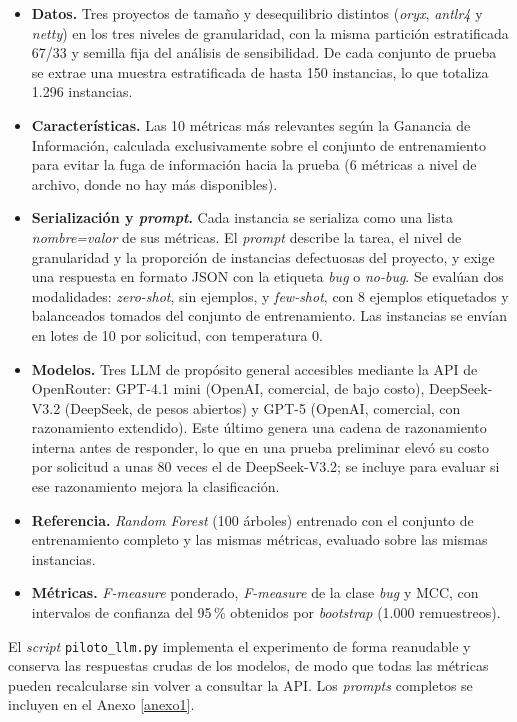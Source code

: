 \begin{itemize}
    \item \textbf{Datos.} Tres proyectos de tamaño y desequilibrio distintos (\textit{oryx}, \textit{antlr4} y \textit{netty}) en los tres niveles de granularidad, con la misma partición estratificada 67/33 y semilla fija del análisis de sensibilidad. De cada conjunto de prueba se extrae una muestra estratificada de hasta 150 instancias, lo que totaliza 1.296 instancias.
    \item \textbf{Características.} Las 10 métricas más relevantes según la Ganancia de Información, calculada exclusivamente sobre el conjunto de entrenamiento para evitar la fuga de información hacia la prueba (6 métricas a nivel de archivo, donde no hay más disponibles).
    \item \textbf{Serialización y \textit{prompt}.} Cada instancia se serializa como una lista \textit{nombre=valor} de sus métricas. El \textit{prompt} describe la tarea, el nivel de granularidad y la proporción de instancias defectuosas del proyecto, y exige una respuesta en formato JSON con la etiqueta \textit{bug} o \textit{no-bug}. Se evalúan dos modalidades: \textit{zero-shot}, sin ejemplos, y \textit{few-shot}, con 8 ejemplos etiquetados y balanceados tomados del conjunto de entrenamiento. Las instancias se envían en lotes de 10 por solicitud, con temperatura 0.
    \item \textbf{Modelos.} Tres LLM de propósito general accesibles mediante la API de OpenRouter: GPT-4.1 mini (OpenAI, comercial, de bajo costo), DeepSeek-V3.2 (DeepSeek, de pesos abiertos) y GPT-5 (OpenAI, comercial, con razonamiento extendido). Este último genera una cadena de razonamiento interna antes de responder, lo que en una prueba preliminar elevó su costo por solicitud a unas 80 veces el de DeepSeek-V3.2; se incluye para evaluar si ese razonamiento mejora la clasificación.
    \item \textbf{Referencia.} \textit{Random Forest} (100 árboles) entrenado con el conjunto de entrenamiento completo y las mismas métricas, evaluado sobre las mismas instancias.
    \item \textbf{Métricas.} \textit{F-measure} ponderado, \textit{F-measure} de la clase \textit{bug} y MCC, con intervalos de confianza del 95\,\% obtenidos por \textit{bootstrap} (1.000 remuestreos).
\end{itemize}

El \textit{script} \texttt{piloto\_llm.py} implementa el experimento de forma reanudable y conserva las respuestas crudas de los modelos, de modo que todas las métricas pueden recalcularse sin volver a consultar la API. Los \textit{prompts} completos se incluyen en el Anexo \ref{anexo1}.

